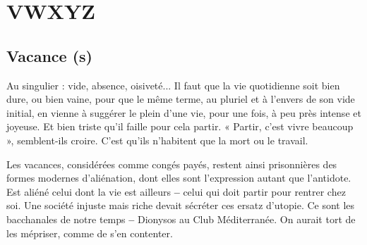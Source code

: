 \chapter{VWXYZ}

\section{Vacance (s)}
Au singulier : vide, absence, oisiveté... Il faut que la vie quotidienne
soit bien dure, ou bien vaine, pour que le même
terme, au pluriel et à l'envers de son vide initial, en vienne à suggérer le plein
d’une vie, pour une fois, à peu près intense et joyeuse. Et bien triste qu’il
faille pour cela partir. « Partir, c’est vivre beaucoup », semblent-ils croire. C’est
qu’ils n’habitent que la mort ou le travail.

Les vacances, considérées comme congés payés, restent ainsi prisonnières
des formes modernes d’aliénation, dont elles sont l'expression autant que l’antidote.
Est aliéné celui dont la vie est ailleurs {\bf --} celui qui doit partir pour rentrer
chez soi. Une société injuste mais riche devait sécréter ces ersatz d’utopie. Ce
sont les bacchanales de notre temps {\bf --} Dionysos au Club Méditerranée. On
aurait tort de les mépriser, comme de s’en contenter.

